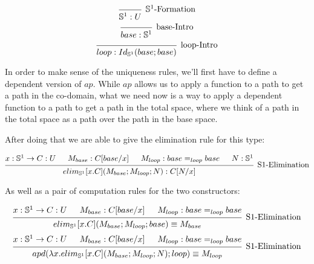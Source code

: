 \documentclass[11pt]{article}
\newcommand{\2}{\textbf{2}}
\newcommand{\Sp}{\mathbb{S}^1}
\begin{document}
\begin{multicols}{3}
  \noindent
  \begin{equation*}
    \begin{prooftree}
      \infer0[$\Sp$-Formation] {
        \Sp : U
      }
    \end{prooftree}
  \end{equation*}
  \begin{equation*}
    \begin{prooftree}
      \infer0[base-Intro] {
        base : \Sp
      }
    \end{prooftree}
  \end{equation*}
  \begin{equation*}
    \begin{prooftree}
      \infer0[loop-Intro] {
        loop : Id_{\Sp}(base; base)
      }
    \end{prooftree}
  \end{equation*}
\end{multicols}

In order to make sense of the uniqueness rules, we'll first have to define a dependent version of $ap$.
While $ap$ allows us to apply a function to a path to get a path in the co-domain, what we need now is a way to apply a dependent function to a path to get a path in the total space, where we think of a path in the total space as a path over the path in the base space.

After doing that we are able to give the elimination rule for this type:

\begin{equation*}
  \begin{prooftree}
    \hypo{x : \Sp \rightarrow C : U}
    \hypo{M_{base} : C[base/x]}
    \hypo{M_{loop} : base =_{loop} base}
    \hypo{N : \Sp}
    \infer4[S1-Elimination] {
      elim_{\Sp}[x.C](M_{base}; M_{loop}; N) : C[N/x]
    }
  \end{prooftree}
\end{equation*}

As well as a pair of computation rules for the two constructors:

\begin{equation*}
  \begin{prooftree}
    \hypo{x : \Sp \rightarrow C : U}
    \hypo{M_{base} : C[base/x]}
    \hypo{M_{loop} : base =_{loop} base}
    \infer3[S1-Elimination] {
      elim_{\Sp}[x.C](M_{base}; M_{loop}; base) \equiv M_{base}
    }
  \end{prooftree}
\end{equation*}
\begin{equation*}
  \begin{prooftree}
    \hypo{x : \Sp \rightarrow C : U}
    \hypo{M_{base} : C[base/x]}
    \hypo{M_{loop} : base =_{loop} base}
    \infer3[S1-Elimination] {
      apd(\lambda x . elim_{\Sp}[x.C](M_{base}; M_{loop}; N); loop) \equiv M_{loop} 
    }
  \end{prooftree}
\end{equation*}
\end{document}
